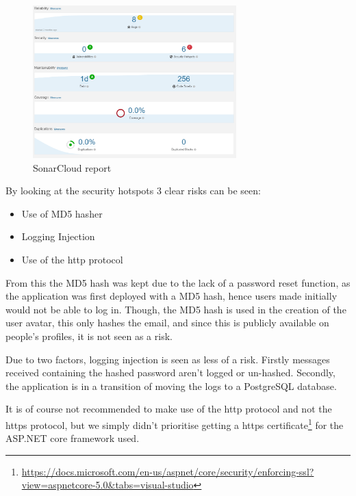\documentclass[report/main.tex]{subfiles}
\begin{document}
        \begin{figure}[H]
            \centering
            \includegraphics[width=0.7\textwidth]{report/images/SonarCloud Report.png}
            \caption{SonarCloud report}
            \label{fig:sonarcloud}
        \end{figure}
        
        By looking at the security hotspots 3 clear risks can be seen:
        
        \begin{itemize}
            \item Use of MD5 hasher
            \item Logging Injection
            \item Use of the http protocol
        \end{itemize}
        
        From this the MD5 hash was kept due to the lack of a password reset function, as the application was first deployed with a MD5 hash, hence users made initially would not be able to log in. Though, the MD5 hash is used in the creation of the user avatar, this only hashes the email, and since this is publicly available on people's profiles, it is not seen as a risk.
        
        Due to two factors, logging injection is seen as less of a risk. Firstly messages received containing the hashed password aren't logged or un-hashed. Secondly, the application is in a transition of moving the logs to a PostgreSQL database.
        
        It is of course not recommended to make use of the http protocol and not the https protocol, but we simply didn't prioritise getting a https certificate\footnote{\hyperlink{https certificate for ASP.NET core}{https://docs.microsoft.com/en-us/aspnet/core/security/enforcing-ssl?view=aspnetcore-5.0\&tabs=visual-studio}} for the ASP.NET core framework used.
        
\end{document}
